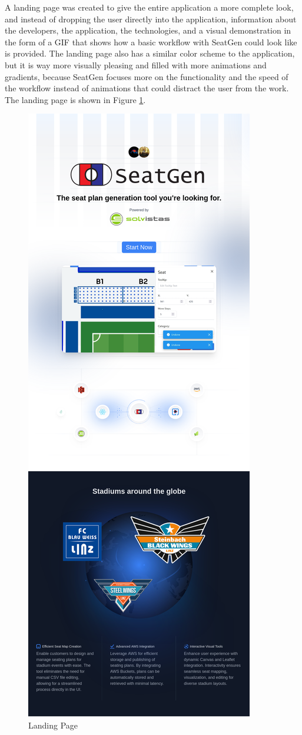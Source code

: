 A landing page was created to give the entire application a more complete look, and instead of dropping the user directly into the application, information about the developers, the application, the technologies, and a visual demonstration in the form of a GIF that shows how a basic workflow with SeatGen could look like is provided. The landing page also has a similar color scheme to the application, but it is way more visually pleasing and filled with more animations and gradients, because SeatGen focuses more on the functionality and the speed of the workflow instead of animations that could distract the user from the work. The landing page is shown in Figure \ref{fig:landing-page}.

\begin{figure}[H]
    \centering
    \includegraphics[scale=0.265]{pics/landing-page.png}
    \caption{Landing Page}
    \label{fig:landing-page}
\end{figure}
\newpage